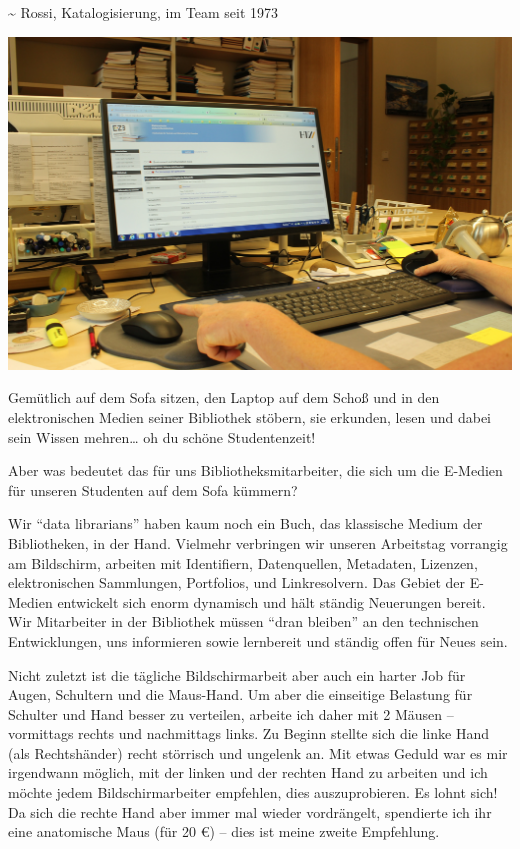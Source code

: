 \textasciitilde{} Rossi, Katalogisierung, im Team seit 1973

\begin{center}
\includegraphics{htw-dresden/img/Maeuse.jpg}
\end{center}

Gemütlich auf dem Sofa sitzen, den Laptop auf dem Schoß und in den
elektronischen Medien seiner Bibliothek stöbern, sie erkunden, lesen und
dabei sein Wissen mehren\ldots{} oh du schöne Studentenzeit!

Aber was bedeutet das für uns Bibliotheksmitarbeiter, die sich um die
E-Medien für unseren Studenten auf dem Sofa kümmern?

Wir \enquote{data librarians} haben kaum noch ein Buch, das klassische
Medium der Bibliotheken, in der Hand. Vielmehr verbringen wir unseren
Arbeitstag vorrangig am Bildschirm, arbeiten mit Identifiern,
Datenquellen, Metadaten, Lizenzen, elektronischen Sammlungen,
Portfolios, und Linkresolvern. Das Gebiet der E-Medien entwickelt sich
enorm dynamisch und hält ständig Neuerungen bereit. Wir Mitarbeiter in
der Bibliothek müssen \enquote{dran bleiben} an den technischen
Entwicklungen, uns informieren sowie lernbereit und ständig offen für
Neues sein.

Nicht zuletzt ist die tägliche Bildschirmarbeit aber auch ein harter Job
für Augen, Schultern und die Maus-Hand. Um aber die einseitige Belastung
für Schulter und Hand besser zu verteilen, arbeite ich daher mit 2
Mäusen -- vormittags rechts und nachmittags links. Zu Beginn stellte
sich die linke Hand (als Rechtshänder) recht störrisch und ungelenk an.
Mit etwas Geduld war es mir irgendwann möglich, mit der linken und der
rechten Hand zu arbeiten und ich möchte jedem Bildschirmarbeiter
empfehlen, dies auszuprobieren. Es lohnt sich! Da sich die rechte Hand
aber immer mal wieder vordrängelt, spendierte ich ihr eine anatomische
Maus (für 20 €) -- dies ist meine zweite Empfehlung.

